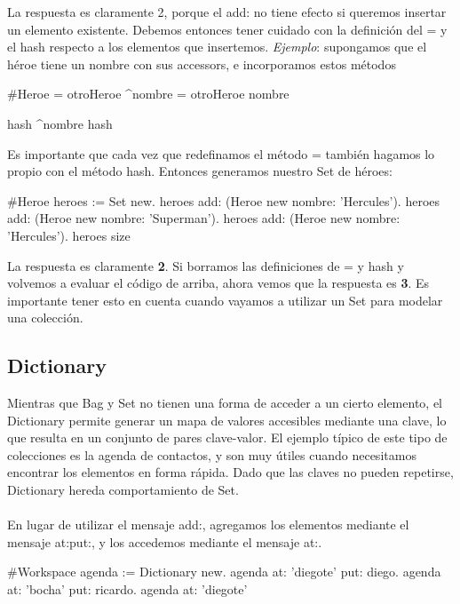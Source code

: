 \documentclass[a4paper,12pt]{book}
\begin{document}
La respuesta es claramente 2, porque el add: no tiene efecto si queremos insertar un elemento existente.
Debemos entonces tener cuidado con la definición del = y el hash respecto a los elementos que insertemos.
\textit{Ejemplo}: supongamos que el héroe tiene un nombre con sus accessors, e incorporamos estos métodos

\begin{code}
#Heroe
= otroHeroe
    ^nombre = otroHeroe nombre
    
hash
    ^nombre hash
\end{code}

Es importante que cada vez que redefinamos el método = también hagamos lo propio con el método hash.
Entonces generamos nuestro Set de héroes:

\begin{code}
#Heroe
heroes := Set new.
heroes add: (Heroe new nombre: 'Hercules').
heroes add: (Heroe new nombre: 'Superman').
heroes add: (Heroe new nombre: 'Hercules').
heroes size
\end{code}

La respuesta es claramente \textbf{2}. Si borramos las definiciones de = y hash y volvemos a evaluar 
el código de arriba, ahora vemos que la respuesta es \textbf{3}. Es importante tener esto en cuenta cuando
vayamos a utilizar un Set para modelar una colección.


\subsection{Dictionary}

Mientras que Bag y Set no tienen una forma de acceder a un cierto elemento, el Dictionary permite generar un
mapa de valores accesibles mediante una clave, lo que resulta en un conjunto de pares clave-valor. El ejemplo
típico de este tipo de colecciones es la agenda de contactos, y son muy útiles cuando necesitamos
encontrar los elementos en forma rápida. Dado que las claves no pueden repetirse, Dictionary hereda
comportamiento de Set. 
\\
\\
En lugar de utilizar el mensaje add:, agregamos los elementos mediante el mensaje at:put:, y los accedemos
mediante el mensaje at:.

\begin{code}
#Workspace
agenda := Dictionary new.
agenda at: 'diegote' put: diego.
agenda at: 'bocha' put: ricardo.
agenda at: 'diegote'
\end{code}
\end{document}

